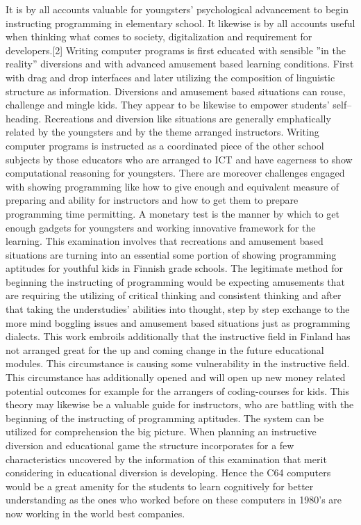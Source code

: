 It is by all accounts valuable for youngsters’ psychological advancement to begin instructing programming in elementary school. It likewise is by all accounts useful when thinking what comes to society, digitalization and requirement for developers.[2] Writing computer programs is first educated with sensible ”in the reality” diversions and with advanced amusement based learning conditions. First with drag and drop interfaces and later utilizing the composition of linguistic structure as information. Diversions and amusement based situations can rouse, challenge and mingle kids. They appear to be likewise to empower students’ self– heading. Recreations and diversion like situations are generally emphatically related by the youngsters and by the theme arranged instructors. Writing computer programs is instructed as a coordinated piece of the other school subjects by those educators who are arranged to ICT and have eagerness to show computational reasoning for youngsters. There are moreover challenges engaged with showing programming like how to give enough and equivalent measure of preparing and ability for instructors and how to get them to prepare programming time permitting. A monetary test is the manner by which to get enough gadgets for youngsters and working innovative framework for the learning. This examination involves that recreations and amusement based situations are turning into an essential some portion of showing programming aptitudes for youthful kids in Finnish grade schools. The legitimate method for beginning the instructing of programming would be expecting amusements that are requiring the utilizing of critical thinking and consistent thinking and after that taking the understudies’ abilities into thought, step by step exchange to the more mind boggling issues and amusement based situations just as programming dialects. This work embroils additionally that the instructive field in Finland has not arranged great for the up and coming change in the future educational modules. This circumstance is causing some vulnerability in the instructive field. This circumstance has additionally opened and will open up new money related potential outcomes for example for the arrangers of coding-courses for kids. This theory may likewise be a valuable guide for instructors, who are battling with the beginning of the instructing of programming aptitudes. The system can be utilized for comprehension the big picture. When planning an instructive diversion and educational game the structure incorporates for a few characteristics uncovered by the information of this examination that merit considering in educational diversion is developing. Hence the C64 computers would be a great amenity for the students to learn cognitively for better understanding as the ones who worked before on these computers in 1980’s are now working in the world best companies.
